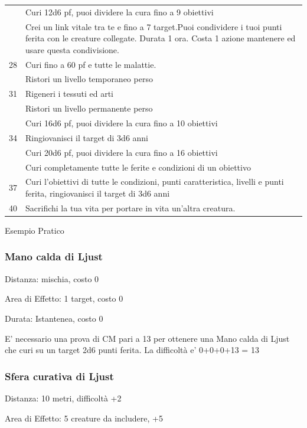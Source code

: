 \documentclass[a4paper,11pt,twoside,openany]{book}
\begin{document}
\begin{tabularx}{\textwidth}{lX}
           & Curi 12d6 pf, puoi dividere la cura fino a 9 obiettivi \\
           & Crei un link vitale tra te e fino a 7 target.Puoi condividere i tuoi punti ferita con le creature collegate. Durata 1 ora. Costa 1 azione mantenere ed usare questa condivisione.  \\
	28     & Curi fino a 60 pf e tutte le malattie. \\
           & Ristori un livello temporaneo perso \\
	31     & Rigeneri i tessuti ed arti\\
           & Ristori un livello permanente perso\\
           & Curi 16d6 pf, puoi dividere la cura fino a 10 obiettivi\\
	34     & Ringiovanisci il target di 3d6 anni\\
           & Curi 20d6 pf, puoi dividere la cura fino a 16 obiettivi\\
           & Curi completamente tutte le ferite e condizioni di un obiettivo\\
	37     & Curi l'obiettivi di tutte le condizioni, punti caratteristica, livelli e punti ferita, ringiovanisci il target di 3d6 anni \\
	40     & Sacrifichi la tua vita per portare in vita un’altra creatura.\\
\end{tabularx}
\bigskip

Esempio Pratico

\subsubsection{Mano calda di Ljust}

Distanza: mischia, costo 0

Area di Effetto: 1 target, costo 0

Durata: Istantenea, costo 0

E’ necessario una prova di CM pari a 13 per ottenere una Mano calda di Ljust che curi su un target
2d6 punti ferita. La difficoltà e’ 0+0+0+13 = 13

\subsubsection{Sfera curativa di Ljust}

Distanza: 10 metri, difficoltà +2

Area di Effetto: 5 creature da includere, +5
\end{document}
